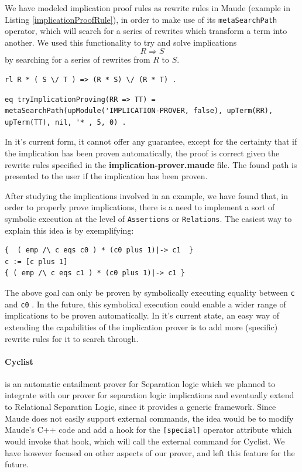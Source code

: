 \documentclass[12pt,a4paper]{article}
\begin{document}
{We have modeled implication proof rules as rewrite rules in Maude (example in Listing \ref{implicationProofRule}), in order to make use of its \texttt{metaSearchPath} operator, which will search for a series of rewrites which transform a term into another. We used this functionality to try and solve implications 
\[
	R \Rightarrow S
\]
by searching for a series of rewrites from \(R\) to \(S\). 
\begin{lstlisting}[label=implicationProofRule,caption=Example of implication proof rule]
rl R * ( S \/ T ) => (R * S) \/ (R * T) .
\end{lstlisting}

\begin{lstlisting}[label=eqImplicationProving,caption=Equation using the metaSearchPath operator]
eq tryImplicationProving(RR => TT) = metaSearchPath(upModule('IMPLICATION-PROVER, false), upTerm(RR), upTerm(TT), nil, '* , 5, 0) . 
\end{lstlisting}
In it's current form, it cannot offer any guarantee, except for the certainty that if the implication has been proven automatically, the proof is correct given the rewrite rules specified in the \textbf{implication-prover.maude} file. The found path is presented to the user if the implication has been proven.

After studying the implications involved in an example, we have found that, in order to properly prove implications, there is a need to implement a sort of symbolic execution at the level of \texttt{Assertions} or \texttt{Relations}. The easiest way to explain this idea is by exemplifying: 
\begin{lstlisting}
{  ( emp /\ c eqs c0 ) * (c0 plus 1)|-> c1  }
c := [c plus 1]
{ ( emp /\ c eqs c1 ) * (c0 plus 1)|-> c1 }
\end{lstlisting}
The above goal can only be proven by symbolically executing equality between \texttt{c} and \texttt{c0} . In the future, this symbolical execution could enable a wider range of implications to be proven automatically. In it's current state, an easy way of extending the capabilities of the implication prover is to add more (specific) rewrite rules for it to search through.

\paragraph{Cyclist}\cite{cyclist} \cite{cyclistSite} is an automatic entailment prover for Separation logic which we planned to integrate with our prover for separation logic implications and eventually extend to Relational Separation Logic, since it provides a generic framework. Since Maude does not easily support external commands, the idea would be to modify Maude's C++ code and add a hook for the \texttt{[special]} operator attribute which would invoke that hook, which will call the external command for Cyclist. We have however focused on other aspects of our prover, and left this feature for the future.
}
\end{document}
